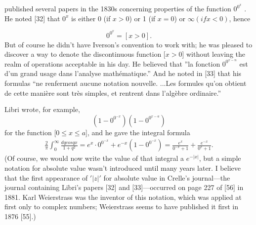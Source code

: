 \documentclass[10pt]{article}
\begin{document}
\section*{}
published several papers in the 1830s concerning properties of the function $0^{0^{x}}$ . He noted  [32]
that $0^x$ is either 0 (if $x>0$) or 1 (if $x=0$) or $\infty (if x<0)$, hence 

\begin{equation}
\tag{1.17}
0^{0^{x}} = [x>0].
\end{equation}
But of course he didn’t have Iverson’s convention to work with; he was pleased to discover a way
to denote the discontinuous function [$x>0$] without leaving the realm of operations acceptable in 
his day. He believed that ''la fonction $0^{0^{x-n}}$ est d'un grand usage dans l'analyse mathématique.''
And he noted in [33] that his formulas “ne renferment aucune notation nouvelle. ...Les formules
qu’on obtient de cette manière sont très simples, et rentrent dans l’algèbre ordinaire.”

Libri wrote, for example,
$$
(1-0^{0^{-x}})(1-0^{0^{x-a}})
$$
for the function [$0\leq x \leq a$], and he gave the integral formula
\begin{eqnarray*}
\frac{2}{\pi} \int_{0}^{\infty} \frac{dqcosqx}{1+q^{2}} = e^x \cdot 0^{0^{-x}} + e^{-x}(1-0^{0^{-x}}) = \frac{e^{x}}{0^{-x}+1}+\frac{e^{-x}}{0^{x}+1}.
\end{eqnarray*}
(Of course, we would now write the value of that integral a $e^{-|x|}$, but a simple notation for
absolute value wasn’t introduced until many years later. I believe that the first appearance of $'|z|'$
for absolute value in Crelle’s journal—the journal containing Libri’s papers [32] and [33]—occurred
on page 227 of [56] in 1881. Karl Weierstrass was the inventor of this notation, which was applied
at first only to complex numbers; Weierstrass seems to have published it first in 1876 [55].)
\end{document}
